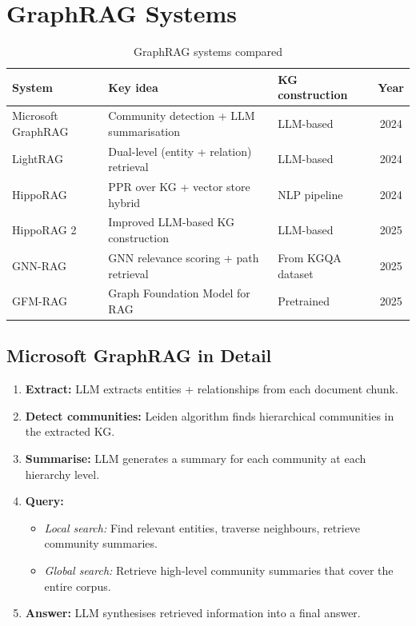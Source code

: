 \documentclass[11pt,a4paper,oneside,openany]{book}
\theoremstyle{definition}
\theoremstyle{plain}
\theoremstyle{remark}
\begin{document}
\section{GraphRAG Systems}\label{sec:graphrag-systems}

\begin{table}[h]
	\centering
	\caption{GraphRAG systems compared}
	\label{tab:graphrag-systems}
	\begin{tabular}{lp{5cm}p{5cm}c}
		\toprule
		System             & Key idea                                 & KG construction   & Year \\
		\midrule
		Microsoft GraphRAG & Community detection + LLM summarisation  & LLM-based         & 2024 \\
		LightRAG           & Dual-level (entity + relation) retrieval & LLM-based         & 2024 \\
		HippoRAG           & PPR over KG + vector store hybrid        & NLP pipeline      & 2024 \\
		HippoRAG 2         & Improved LLM-based KG construction       & LLM-based         & 2025 \\
		GNN-RAG            & GNN relevance scoring + path retrieval   & From KGQA dataset & 2025 \\
		GFM-RAG            & Graph Foundation Model for RAG           & Pretrained        & 2025 \\
		\bottomrule
	\end{tabular}
\end{table}

\subsection{Microsoft GraphRAG in Detail}

\begin{enumerate}
	\item \textbf{Extract:} LLM extracts entities + relationships from each document chunk.
	\item \textbf{Detect communities:} Leiden algorithm finds hierarchical communities in the extracted KG.
	\item \textbf{Summarise:} LLM generates a summary for each community at each hierarchy level.
	\item \textbf{Query:}
	      \begin{itemize}
		      \item \textit{Local search:} Find relevant entities, traverse neighbours, retrieve community summaries.
		      \item \textit{Global search:} Retrieve high-level community summaries that cover the entire corpus.
	      \end{itemize}
	\item \textbf{Answer:} LLM synthesises retrieved information into a final answer.
\end{enumerate}
\end{document}
